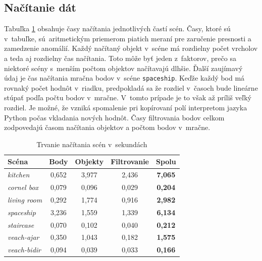 \subsection*{Načítanie dát}
Tabuľka \ref{LoadingTimes} obsahuje časy načítania jednotlivých častí scén. Časy, ktoré sú v~tabuľke, sú~aritmetickým priemerom piatich meraní pre zaručenie presnosti a zamedzenie anomálií. Každý načítaný objekt v~scéne má rozdielny počet vrcholov a teda aj rozdielny čas načítania. Toto môže byť jeden z~faktorov, prečo sa niektoré scény s~menším počtom objektov načítavajú dlhšie. Ďalší zaujímavý údaj je čas načítania mračna bodov v~scéne \verb|spaceship|. Keďže každý bod má rovnaký počet hodnôt v~riadku, predpokladá sa že rozdiel v~časoch bude lineárne stúpať podľa počtu bodov v~mračne. V~tomto prípade je to však až príliš veľký rozdiel. Je možné, že vzniká spomalenie pri kopírovaní polí interpretom jazyka \mbox{Python} počas vkladania nových hodnôt. Časy filtrovania bodov celkom zodpovedajú časom načítania objektov a počtom bodov v~mračne.
\begin{table}[h!] \label{LoadingTimes}
\centering
\begin{tabular}{|l|c|c|c|c|}
\hline
\textbf{Scéna} & \textbf{Body} & \textbf{Objekty} & \textbf{Filtrovanie} & \textbf{Spolu}   \\ \hline
\textit{kitchen} & 0,652 & 3,977 & 2,436 & \textbf{7,065}\\ \hline
\textit{cornel box} & 0,079 & 0,096 & 0,029 & \textbf{0,204} \\ \hline
\textit{living room} & 0,292 & 1,774 & 0,916 & \textbf{2,982} \\ \hline
\textit{spaceship} & 3,236 & 1,559 & 1,339 & \textbf{6,134} \\ \hline
\textit{staircase} & 0,070 & 0,102 & 0,040 & \textbf{0,212} \\ \hline
\textit{veach-ajar} & 0,350 & 1,043 & 0,182 & \textbf{1,575} \\ \hline
\textit{veach-bidir} & 0,094 & 0,039 & 0,033 & \textbf{0,166} \\ \hline
\end{tabular}
\caption{Trvanie načítania scén v~sekundách}
\end{table}
